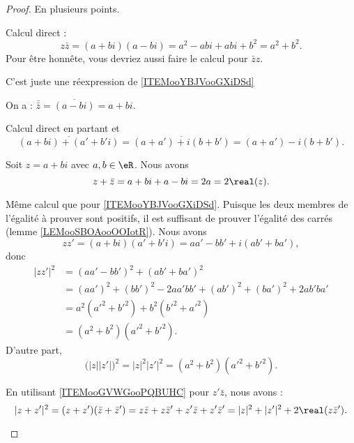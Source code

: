 \begin{proof}
	En plusieurs points.
	\begin{subproof}
		Calcul direct :
		\begin{equation}
			z\bar z=(a+bi)(a-bi)=a^2-abi+abi+b^2=a^2+b^2.
		\end{equation}
		Pour être honnête, vous devriez aussi faire le calcul pour \( \bar zz\).

		C'est juste une réexpression de \ref{ITEMooYBJVooGXiDSd}

		On a : \( \bar{\bar z}=\overline{ (a-bi) }=a+bi\).

		Calcul direct en partant et
		\begin{equation}
			\overline{(a+bi)+(a'+b'i)}=\overline{(a+a')+i(b+b')}=(a+a')-i(b+b').
		\end{equation}

		Soit \( z=a+bi\) avec \( a,b\in \eR\). Nous avons
		\begin{equation}
			z+\bar z=a+bi+a-bi=2a=2\real(z).
		\end{equation}

		Même calcul que pour \ref{ITEMooYBJVooGXiDSd}.
		Puisque les deux membres de l'égalité à prouver sont positifs, il est suffisant de prouver l'égalité des carrés (lemme \ref{LEMooSBOAooOOIotR}). Nous avons
		\begin{equation}
			zz'=(a+bi)(a'+b'i)=aa'-bb'+i(ab'+ba'),
		\end{equation}
		donc
		\begin{subequations}
			\begin{align}
				| zz' |^2 & =(aa'-bb')^2+(ab'+ba')^2                         \\
				          & =(aa')^2+(bb')^2-2aa'bb'+(ab')^2+(ba')^2+2ab'ba' \\
				          & =a^2(a'^2+b'^2)+b^2(b'^2+a'^2)                   \\
				          & =(a^2+b^2)(a'^2+b'^2).
			\end{align}
		\end{subequations}
		D'autre part,
		\begin{equation}        \label{EQooRSGGooGfWTrS}
			\big( | z | |z' | \big)^2=| z |^2| z' |^2=(a^2+b^2)(a'^2+b'^2).
		\end{equation}

		En utilisant \ref{ITEMooGVWGooPQBUHC} pour \( z'\bar z\), nous avons :
		\begin{equation}
			| z+z' |^2=(z+z')(\bar z+\bar z')=z\bar z+z\bar z'+z'\bar z+z'\bar z'=| z |^2+| z' |^2+2\real(z\bar z').
		\end{equation}
	\end{subproof}
\end{proof}


